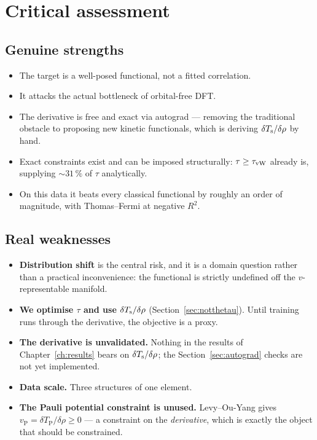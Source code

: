 \section{Critical assessment}

\subsection{Genuine strengths}

\begin{itemize}
  \item The target is a well-posed functional, not a fitted correlation.
  \item It attacks the actual bottleneck of orbital-free DFT.
  \item The derivative is free and exact via autograd --- removing the
    traditional obstacle to proposing new kinetic functionals, which is
    deriving $\delta T_{\mathrm{s}}/\delta\rho$ by hand.
  \item Exact constraints exist and can be imposed structurally:
    $\tau\ge\tau_{\mathrm{vW}}$ already is, supplying $\sim31\,\%$ of $\tau$ analytically.
  \item On this data it beats every classical functional by roughly an order of
    magnitude, with Thomas--Fermi at negative $R^2$.
\end{itemize}

\subsection{Real weaknesses}

\begin{itemize}
  \item \textbf{Distribution shift} is the central risk, and it is a domain
    question rather than a practical inconvenience: the functional is strictly
    undefined off the $v$-representable manifold.
  \item \textbf{We optimise $\tau$ and use $\delta T_{\mathrm{s}}/\delta\rho$}
    (Section~\ref{sec:notthetau}). Until training runs through the derivative,
    the objective is a proxy.
  \item \textbf{The derivative is unvalidated.} Nothing in the results of
    Chapter~\ref{ch:results} bears on $\delta T_{\mathrm{s}}/\delta\rho$; the
    Section~\ref{sec:autograd} checks are not yet implemented.
  \item \textbf{Data scale.} Three structures of one element.
  \item \textbf{The Pauli potential constraint is unused.} Levy--Ou-Yang gives
    $v_{\mathrm{P}}=\delta T_{\mathrm{P}}/\delta\rho\ge0$ --- a constraint on
    the \emph{derivative}, which is exactly the object that should be
    constrained.
\end{itemize}

